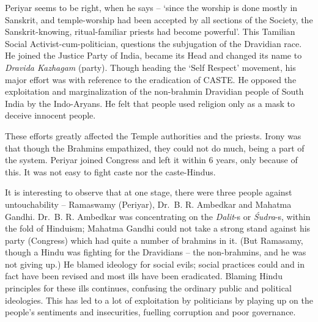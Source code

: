 Periyar seems to be right, when he says – ‘since the worship is done mostly in Sanskrit, and temple-worship had been accepted by all sections of the Society, the Sanskrit-knowing, ritual-familiar priests had become powerful'. This Tamilian Social Activist-cum-politician, questions the subjugation of the Dravidian race. He joined the Justice Party of India, became its Head and changed its name to \textit{Dravida Kazhagam} (party). Though heading the ‘Self Respect’ movement, his major effort was with reference to the eradication of CASTE. He opposed the exploitation and marginalization of the non-brahmin Dravidian people of South India by the Indo-Aryans. He felt that people used religion only as a mask to deceive innocent people.

These efforts greatly affected the Temple authorities and the priests. Irony was that though the Brahmins empathized, they could not do much, being a part of the system. Periyar joined Congress and left it within 6 years, only because of this. It was not easy to fight caste nor the caste-Hindus.

It is interesting to observe that at one stage, there were three people against untouchability – Ramaswamy (Periyar), Dr.\ B. R. Ambedkar and Mahatma Gandhi. Dr.\ B. R. Ambedkar was concentrating on the \textit{Dalit}-s or \textit{Śudra}-s, within the fold of Hinduism; Mahatma Gandhi could not take a strong stand against his party (Congress) which had quite a number of brahmins in it. (But Ramasamy, though a Hindu was fighting for the Dravidians – the non-brahmins, and he was not giving up.) He blamed ideology for social evils; social practices could and in fact have been revised and most ills have been eradicated. Blaming Hindu principles for these ills continues, confusing the ordinary public and political ideologies. This has led to a lot of exploitation by politicians by playing up on the people’s sentiments and insecurities, fuelling corruption and poor governance.

